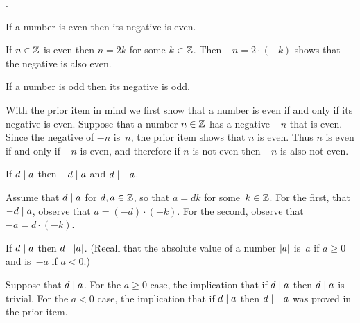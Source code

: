 \documentclass{ibl}  %
\begin{document}
\begin{problem}  
\label{ex:InteractionOfParityWithSign}
\pord.
\begin{exes}
  \begin{exercise}
    If a number is even then its negative is even.
  \end{exercise}
  \begin{answer}
    If $n\in\mathbb{Z}$ is even then $n=2k$ for some $k\in\mathbb{Z}$.
    Then $-n=2\cdot(-k)$ shows that the negative is also even.  
  \end{answer}
  \begin{exercise}
    If a number is odd then its negative is odd.
  \end{exercise}
  \begin{answer}
    With the prior item in mind we first show that a number is even
    if and only if its negative is even.
    Suppose that a number $n\in\mathbb{Z}$ has a negative $-n$ that is even.
    Since the negative of $-n$ is~$n$, the prior item shows that $n$ is even.
    Thus $n$ is even if and only if $-n$ is even, and therefore
    if $n$ is not even then $-n$ is also not even.
  \end{answer}
  \begin{exercise}
    If $d\mid a$ then $-d\mid a$ and $d\mid -a$.
  \end{exercise}
  \begin{answer}
    Assume that $d\mid a$ for $d,a\in\mathbb{Z}$, so that 
    $a=dk$ for some~$k\in\mathbb{Z}$.
    For the first, that $-d\mid a$, observe that
    $a=(-d)\cdot(-k)$.
    For the second, observe that $-a=d\cdot(-k)$.
  \end{answer}
  \begin{exercise}
    If $d\mid a$ then $d\mid\lvert a\rvert$.
    (Recall that the absolute value of a number $\lvert a\rvert$ is~$a$ 
    if $a\geq 0$ and is~$-a$ if $a<0$.)
  \end{exercise}
  \begin{answer}
    Suppose that $d\mid a$.
    For the $a\geq 0$ case, the implication that if $d\mid a$ then 
    $d\mid a$ is trivial.
    For the $a<0$ case, 
    the implication that if $d\mid a$ then $d\mid -a$ was
    proved in the prior item.    
  \end{answer}
\end{exes}  
\end{problem}
\end{document}
